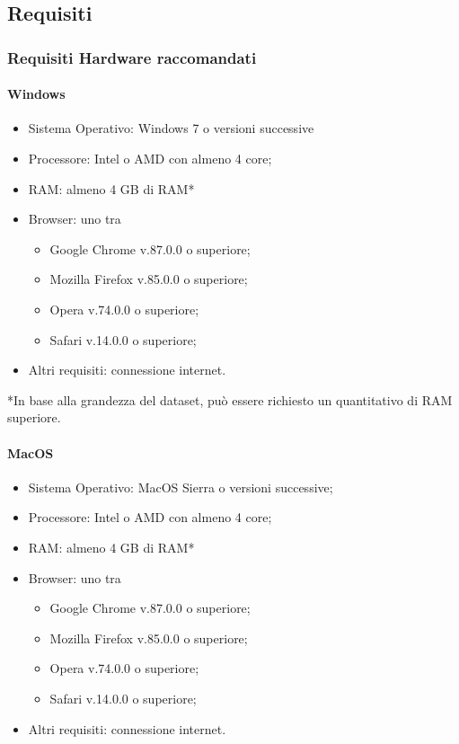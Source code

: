 \documentclass[../manuale_sviluppatore.tex]{subfiles}
\begin{document}
\subsection{Requisiti}
    \label{sec:requisiti}
\subsubsection{Requisiti Hardware raccomandati}
    \label{subsub:req_h}

\paragraph{Windows}
    \label{par:Windows_req}

\begin{itemize}
    \item Sistema Operativo: Windows 7 o versioni successive
    \item Processore: Intel o AMD con almeno 4 core;
    \item RAM: almeno 4 GB di RAM*
    \item Browser: uno tra \begin{itemize}
        \vspace{-5pt}
        \item Google Chrome v.87.0.0 o superiore;
        \item Mozilla Firefox v.85.0.0 o superiore;
        \item Opera v.74.0.0 o superiore;
        \item Safari v.14.0.0 o superiore;
    \end{itemize}
    \item Altri requisiti: connessione internet.
\end{itemize}

*In base alla grandezza del dataset, può essere richiesto un quantitativo di RAM superiore.

\paragraph{MacOS}
    \label{par:mac_req}

\begin{itemize}
    \item Sistema Operativo: MacOS Sierra o versioni successive;
    \item Processore: Intel o AMD con almeno 4 core;
    \item RAM: almeno 4 GB di RAM*
    \item Browser: uno tra \begin{itemize}
        \vspace{-5pt}
        \item Google Chrome v.87.0.0 o superiore;
        \item Mozilla Firefox v.85.0.0 o superiore;
        \item Opera v.74.0.0 o superiore;
        \item Safari v.14.0.0 o superiore;
    \end{itemize}
    \item Altri requisiti: connessione internet.
\end{itemize}
\end{document}
